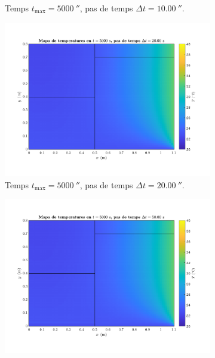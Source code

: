 \begin{figure}[ht]
\begin{subfigure}{.5\textwidth}
		\vspace{-15pt}
		\caption{Temps $t_\text{max} = 5000 \ \second$, pas de temps $\Delta t = 10.00 \ \second$.}
		\label{fig:pas_temps_10}
	\end{subfigure}
	\begin{subfigure}{.5\textwidth}
		\centering
		\includegraphics[width=.95\linewidth]{imagenes/04_analisi_influencia_dades_numeriques/pas_temps/pas_temps_11.pdf}
		\vspace{-15pt}
		\caption{Temps $t_\text{max} = 5000 \ \second$, pas de temps $\Delta t = 20.00 \ \second$.}
		\label{fig:pas_temps_11}
	\end{subfigure}%
	\begin{subfigure}{.5\textwidth}
		\centering
		\includegraphics[width=.95\linewidth]{imagenes/04_analisi_influencia_dades_numeriques/pas_temps/pas_temps_12.pdf}

\end{subfigure}
\end{figure}
